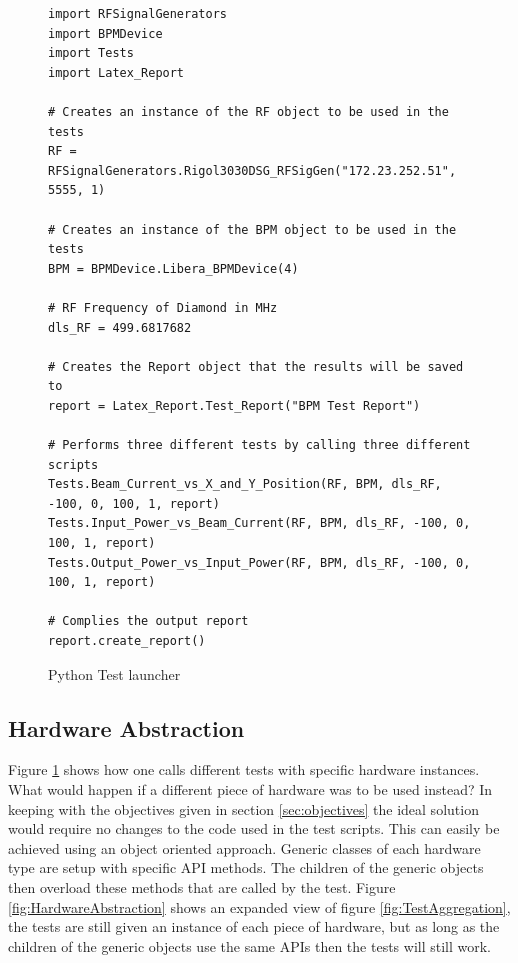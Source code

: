 \documentclass[a4paper, 11pt]{article}
\begin{document}
\begin{figure}[H]
\begin{verbatim}
import RFSignalGenerators
import BPMDevice
import Tests
import Latex_Report

# Creates an instance of the RF object to be used in the tests
RF = RFSignalGenerators.Rigol3030DSG_RFSigGen("172.23.252.51", 5555, 1)

# Creates an instance of the BPM object to be used in the tests
BPM = BPMDevice.Libera_BPMDevice(4)

# RF Frequency of Diamond in MHz 
dls_RF = 499.6817682

# Creates the Report object that the results will be saved to
report = Latex_Report.Test_Report("BPM Test Report")

# Performs three different tests by calling three different scripts
Tests.Beam_Current_vs_X_and_Y_Position(RF, BPM, dls_RF, -100, 0, 100, 1, report)
Tests.Input_Power_vs_Beam_Current(RF, BPM, dls_RF, -100, 0, 100, 1, report)
Tests.Output_Power_vs_Input_Power(RF, BPM, dls_RF, -100, 0, 100, 1, report)

# Complies the output report 
report.create_report()
\end{verbatim}
\caption{Python Test launcher}
\label{fig:launcher.py}
\end{figure}

\subsection{Hardware Abstraction}
Figure \ref{fig:launcher.py} shows how one calls different tests with specific hardware instances. What would happen if a different piece of hardware was to be used instead? In keeping with the objectives given in section \ref{sec:objectives} the ideal solution would require no changes to the code used in the test scripts. This can easily be achieved using an object oriented approach. Generic classes of each hardware type are setup with specific API methods. The children of the generic objects then overload these methods that are called by the test. Figure \ref{fig:HardwareAbstraction} shows an expanded view of figure \ref{fig:TestAggregation}, the tests are still given an instance of each piece of hardware, but as long as the children of the generic objects use the same APIs then the tests will still work. 
\end{document}
